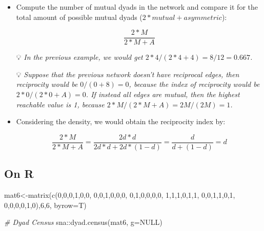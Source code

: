 \documentclass[
  notitlepage,
  onecolumn,
  openany]{book}
\newenvironment{Shaded}{\begin{snugshade}}{\end{snugshade}}
\newcommand{\AttributeTok}[1]{\textcolor[rgb]{0.77,0.63,0.00}{#1}}
\newcommand{\CommentTok}[1]{\textcolor[rgb]{0.56,0.35,0.01}{\textit{#1}}}
\newcommand{\ConstantTok}[1]{\textcolor[rgb]{0.00,0.00,0.00}{#1}}
\newcommand{\DecValTok}[1]{\textcolor[rgb]{0.00,0.00,0.81}{#1}}
\newcommand{\FunctionTok}[1]{\textcolor[rgb]{0.00,0.00,0.00}{#1}}
\newcommand{\NormalTok}[1]{#1}
\newcommand{\OtherTok}[1]{\textcolor[rgb]{0.56,0.35,0.01}{#1}}
\newcommand{\SpecialCharTok}[1]{\textcolor[rgb]{0.00,0.00,0.00}{#1}}
\begin{document}
\begin{itemize}
\item
  Compute the number of mutual dyads in the network and compare it for the total amount of possible mutual dyads (\(2 * mutual + asymmetric\)):

  \[
    \frac{2*M}{2*M+A}
    \]

  💡 \emph{In the previous example, we would get \(2*4/(2*4+4) = 8/12 = 0.667\).}

  💡 \emph{Suppose that the previous network doesn't have reciprocal edges, then reciprocity would be \(0/(0+8) = 0\), because the index of reciprocity would be \(2*0/(2*0+A) = 0\).
  If instead all edges are mutual, then the highest reachable value is 1, because \(2*M/(2*M+A) = 2M/(2M) = 1\).}
\item
  Considering the density, we would obtain the reciprocity index by:

  \[
    \frac{2*M}{2*M+A} = \frac{2d*d}{2 d*d+2d*(1-d)} = \frac{d}{d+(1-d)} = d
    \]
\end{itemize}

\hypertarget{on-r}{%
\subsection{On R}\label{on-r}}

\begin{Shaded}
\begin{Highlighting}[]
\NormalTok{mat6}\OtherTok{\textless{}{-}}\FunctionTok{matrix}\NormalTok{(}\FunctionTok{c}\NormalTok{(}\DecValTok{0}\NormalTok{,}\DecValTok{0}\NormalTok{,}\DecValTok{0}\NormalTok{,}\DecValTok{1}\NormalTok{,}\DecValTok{0}\NormalTok{,}\DecValTok{0}\NormalTok{,}
               \DecValTok{0}\NormalTok{,}\DecValTok{0}\NormalTok{,}\DecValTok{1}\NormalTok{,}\DecValTok{0}\NormalTok{,}\DecValTok{0}\NormalTok{,}\DecValTok{0}\NormalTok{,}
               \DecValTok{0}\NormalTok{,}\DecValTok{1}\NormalTok{,}\DecValTok{0}\NormalTok{,}\DecValTok{0}\NormalTok{,}\DecValTok{0}\NormalTok{,}\DecValTok{0}\NormalTok{,}
               \DecValTok{1}\NormalTok{,}\DecValTok{1}\NormalTok{,}\DecValTok{1}\NormalTok{,}\DecValTok{0}\NormalTok{,}\DecValTok{1}\NormalTok{,}\DecValTok{1}\NormalTok{,}
               \DecValTok{0}\NormalTok{,}\DecValTok{0}\NormalTok{,}\DecValTok{1}\NormalTok{,}\DecValTok{1}\NormalTok{,}\DecValTok{0}\NormalTok{,}\DecValTok{1}\NormalTok{,}
               \DecValTok{0}\NormalTok{,}\DecValTok{0}\NormalTok{,}\DecValTok{0}\NormalTok{,}\DecValTok{0}\NormalTok{,}\DecValTok{1}\NormalTok{,}\DecValTok{0}\NormalTok{),}\DecValTok{6}\NormalTok{,}\DecValTok{6}\NormalTok{, }\AttributeTok{byrow=}\NormalTok{T)}

\CommentTok{\# Dyad Census}
\NormalTok{sna}\SpecialCharTok{::}\FunctionTok{dyad.census}\NormalTok{(mat6, }\AttributeTok{g=}\ConstantTok{NULL}\NormalTok{)}
\end{Highlighting}
\end{Shaded}
\end{document}
